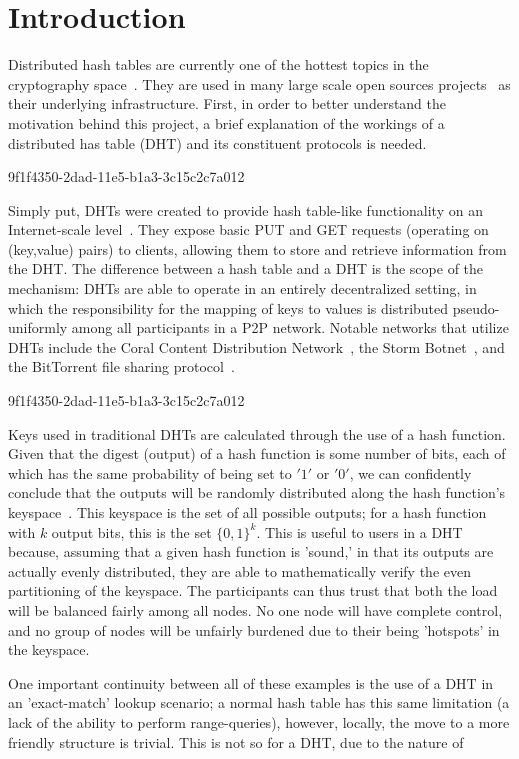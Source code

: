\documentclass[12pt]{article}
\begin{document}
\section{Introduction}
\par Distributed hash tables are currently one of the hottest topics in the cryptography space~\cite{Stoica:2001dj,Rowstron:2001ea,Ratnasamy:2001wn}. They are used in many large scale open sources projects~\cite{Freitas:2013tb,Xu:2010vs,Perfitt:2010fh} as their underlying infrastructure. First, in order to better understand the motivation behind this project, a brief explanation of the workings of a distributed has table (DHT) and its constituent protocols is needed.

9f1f4350-2dad-11e5-b1a3-3c15c2c7a012\par Simply put, DHTs were created to provide hash table-like functionality on an Internet-scale level~\cite{Ratnasamy:2001wn}. They expose basic PUT and GET requests (operating on (key,value) pairs) to clients, allowing them to store and retrieve information from the DHT. The difference between a hash table and a DHT is the scope of the mechanism: DHTs are able to operate in an entirely decentralized setting, in which the responsibility for the mapping of keys to values is distributed pseudo-uniformly among all participants in a P2P network. Notable networks that utilize DHTs include the Coral Content Distribution Network~\cite{Freedman:2004vb}, the Storm Botnet~\cite{Holz:2008uk}, and the BitTorrent file sharing protocol~\cite{Cohen:y1_8mBnw}.

9f1f4350-2dad-11e5-b1a3-3c15c2c7a012\par Keys used in traditional DHTs are calculated through the use of a hash function. Given that the digest (output) of a hash function is some number of bits, each of which has the same probability of being set to $'1'$ or $'0'$, we can confidently conclude that the outputs will be randomly distributed along the hash function's keyspace~. This keyspace is the set of all possible outputs; for a hash function with $k$ output bits, this is the set $\{0,1\}^k$. This is useful to users in a DHT because, assuming that a given hash function is 'sound,' in that its outputs are actually evenly distributed, they are able to mathematically verify the even partitioning of the keyspace. The participants can thus trust that both the load will be balanced fairly among all nodes. No one node will have complete control, and no group of nodes will be unfairly burdened due to their being 'hotspots' in the keyspace.~

\par One important continuity between all of these examples is the use of a DHT in an 'exact-match' lookup scenario; a normal hash table has this same limitation (a lack of the ability to perform range-queries), however, locally, the move to a more friendly structure is trivial. This is not so for a DHT, due to the nature of
\printbibliography
\end{document}
